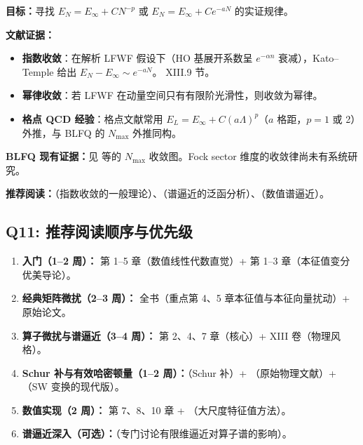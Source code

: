 \documentclass{article}
\begin{document}
\textbf{目标：}寻找 $E_{N}=E_{\infty}+C N^{-p}$ 或 $E_{N}=E_{\infty}+Ce^{-aN}$ 的实证规律。

\textbf{文献证据：}
\begin{itemize}
    \item \textbf{指数收敛}：在解析 LFWF 假设下（HO 基展开系数呈 $e^{-\alpha n}$ 衰减），Kato--Temple 给出 $E_{N}-E_{\infty}\sim e^{-aN}$。\cite{Reed_Simon_1978} XIII.9 节。
    \item \textbf{幂律收敛}：若 LFWF 在动量空间只有有限阶光滑性，则收敛为幂律。
    \item \textbf{格点 QCD 经验}：格点文献常用 $E_{L}=E_{\infty}+C(a\Lambda)^{p}$（$a$ 格距，$p=1$ 或 2）外推，与 BLFQ 的 $N_{\max}$ 外推同构。
\end{itemize}

\textbf{BLFQ 现有证据：}见 \cite{Li_2016} 等的 $N_{\max}$ 收敛图。Fock sector 维度的收敛律尚未有系统研究。

\textbf{推荐阅读：}\cite{Kato_1976}（指数收敛的一般理论）、\cite{Reed_Simon_1978}（谱逼近的泛函分析）、\cite{Chatelin_1983}（数值谱逼近）。

\subsection{Q11: 推荐阅读顺序与优先级}

\begin{enumerate}
    \item \textbf{入门（1--2 周）：}\cite{Trefethen_Bau_1997} 第 1--5 章（数值线性代数直觉）+ \cite{Bhatia_1997} 第 1--3 章（本征值变分优美导论）。
    \item \textbf{经典矩阵微扰（2--3 周）：}\cite{Stewart_Sun_1990} 全书（重点第 4、5 章本征值与本征向量扰动）+ \cite{Davis_Kahan_1970} 原始论文。
    \item \textbf{算子微扰与谱逼近（3--4 周）：}\cite{Kato_1976} 第 2、4、7 章（核心）+ \cite{Reed_Simon_1978} XIII 卷（物理风格）。
    \item \textbf{Schur 补与有效哈密顿量（1--2 周）：}\cite{Zhang_2005_Schur}（Schur 补）+ \cite{Feshbach_1958}（原始物理文献）+ \cite{Schrieffer_Wolff_1966,Bravyi_2011_SchriefferWolff}（SW 变换的现代版）。
    \item \textbf{数值实现（2 周）：}\cite{Golub_VanLoan_2013} 第 7、8、10 章 + \cite{Saad_2011}（大尺度特征值方法）。
    \item \textbf{谱逼近深入（可选）：}\cite{Chatelin_1983}（专门讨论有限维逼近对算子谱的影响）。
\end{enumerate}
\end{document}
